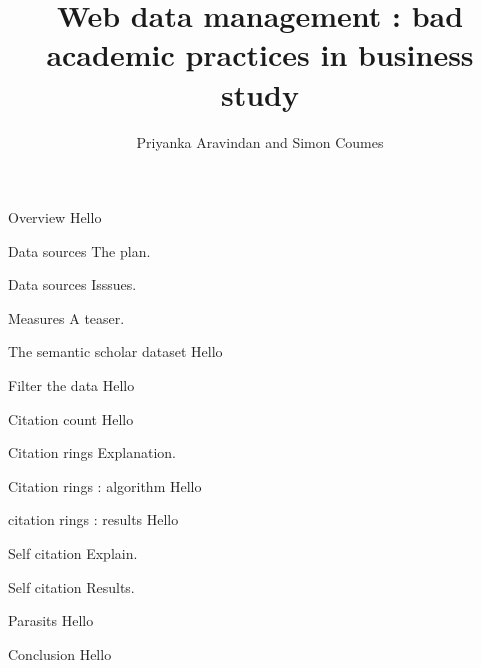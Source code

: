 \documentclass[10pt]{beamer}
\title{Web data management : bad academic practices in business study}
\author{Priyanka Aravindan and Simon Coumes}
\date{}
\begin{document}
\begin{frame}
\titlepage
\end{frame}

\begin{frame}{Overview}
  Hello
  \end{frame}

\begin{frame}{Data sources}
  The plan.
  \end{frame}

\begin{frame}{Data sources}
  Isssues.
  \end{frame}

\begin{frame}{Measures}
  A teaser.
  \end{frame}

\begin{frame}{The semantic scholar dataset}
  Hello
  \end{frame}

\begin{frame}{Filter the data}
  Hello
  \end{frame}

\begin{frame}{Citation count}
  Hello
  \end{frame}

\begin{frame}{Citation rings}
  Explanation.
  \end{frame}

\begin{frame}{Citation rings : algorithm}
  Hello
  \end{frame}

\begin{frame}{citation rings : results}
  Hello
  \end{frame}

\begin{frame}{Self citation}
  Explain.
  \end{frame}

\begin{frame}{Self citation}
  Results.
  \end{frame}

\begin{frame}{Parasits}
  Hello
  \end{frame}

\begin{frame}{Conclusion}
  Hello
  \end{frame}
\end{document}

